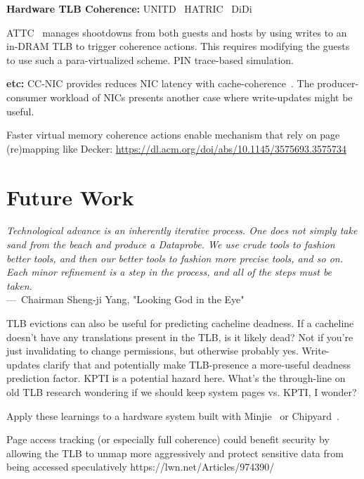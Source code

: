 \textbf{Hardware TLB Coherence:}
UNITD~\cite{romanescu_unified_2010}
HATRIC~\cite{yan_hardware_2017}
DiDi~\cite{villavieja_didi_2011}

ATTC~\cite{gugale_attc_2020} manages shootdowns from both guests and hosts by using writes to an in-DRAM TLB to trigger coherence actions. This requires modifying the guests to use such a para-virtualized scheme. PIN trace-based simulation.

\textbf{etc:} CC-NIC provides reduces NIC latency with cache-coherence~\cite{schuh_cc-nic_2024}. The producer-consumer workload of NICs presents another case where write-updates might be useful.

Faster virtual memory coherence actions enable mechanism that rely on page (re)mapping like Decker: \url{https://dl.acm.org/doi/abs/10.1145/3575693.3575734}

\section{Future Work}

\begin{epigraph}
	\emph{Technological advance is an inherently iterative process. One does not simply take sand from the beach and produce a Dataprobe. We use crude tools to fashion better tools, and then our better tools to fashion more precise tools, and so on. Each minor refinement is a step in the process, and all of the steps must be taken.}\\
	---~Chairman Sheng-ji Yang, "Looking God in the Eye"
\end{epigraph}

TLB evictions can also be useful for predicting cacheline deadness. If a cacheline doesn't have any translations present in the TLB, is it likely dead? Not if you're just invalidating to change permissions, but otherwise probably yes. Write-updates clarify that and potentially make TLB-presence a more-useful deadness prediction factor. KPTI is a potential hazard here. What's the through-line on old TLB research \cite{clark_performance_1985} wondering if we should keep system pages vs. KPTI, I wonder?

Apply these learnings to a hardware system built with Minjie~\cite{xu_towards_2022} or Chipyard~\cite{amid_chipyard_2020}.

Page access tracking (or especially full coherence) could benefit security by allowing the TLB to unmap more aggressively and protect sensitive data from being accessed speculatively https://lwn.net/Articles/974390/

\endinput